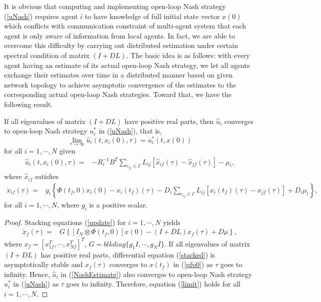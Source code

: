 \documentclass[12pt,draftcls,onecolumn]{IEEEtran}  %
\begin{document}
It is obvious that computing and implementing open-loop Nash strategy (\ref{uNash}) requires agent $i$ to have knowledge of full initial state vector $x(0)$ which conflicts with communication constraint of multi-agent system that each agent is only aware of information from local agents. In fact, we are able to overcome this difficulty by carrying out distributed estimation under certain spectral condition of matrix $(I+DL)$. The basic idea is as follows: with every agent having an estimate of its actual open-loop Nash strategy, we let all agents exchange their estimates over time in a distributed manner based on given network topology to achieve asymptotic convergence of the estimates to the corresponding actual open-loop Nash strategies. Toward that, we have the following result.
\begin{thm}\label{Thm1}
If all eigenvalues of matrix $(I+DL)$ have positive real parts, then $\hat{u}_i$ converges to open-loop Nash strategy $u^*_i$ in (\ref{uNash}), that is,
\begin{equation}
\lim_{\tau\rightarrow\infty}\hat{u}_i(t, x_i(0), \tau) = u^*_i(t,x(0))\label{limit}
\end{equation}
for all $i=1,\cdots,N$ given
\begin{align}
\hat{u}_i(t,x_i(0),\tau) =&-R_i^{-1}B^T\sum_{e_{ij}\in\mathcal{E}}L_{ij}[\hat{x}_{if}(\tau)-\hat{x}_{jf}(\tau)]-\mu_i,\label{NashEstimate}
\end{align}
where $\hat{x}_{if}$ satisfies
\begin{align}
\dot{x}_{if}(\tau)=&g_i\left\{\Phi(t_f,0)x_i(0)-x_i(t_f)(\tau)-D_i\sum_{e_{ij}\in\mathcal{E}}L_{ij}[x_i(t_f)(\tau)-x_{jf}(\tau)]+D_i\mu_i\right\},\label{update}
\end{align}
for all $i=1,\cdots,N$, where $g_i$ is a positive scalar.
\end{thm}
\begin{proof}
Stacking equations (\ref{update}) for $i=1,\cdots,N$ yields
\begin{align}
\dot{x}_{f}(\tau)=&G\left\{[I_N\otimes\Phi(t_f,0)]x(0)-(I+DL)x_f(\tau)+D\mu\right\},\label{stacked}
\end{align}
where $x_f=[x_{1f}^T,\cdots,x_{Nf}^T]^T$, $G=blkdiag\{g_1I,\cdots,g_NI\}$. If all eigenvalues of matrix $(I+DL)$ has positive real parts, differential equation (\ref{stacked}) is asymptotically stable and $x_{f}(\tau)$ converges to $x(t_f)$ in (\ref{pfp0}) as $\tau$ goes to infinity. Hence, $\hat{u}_i$ in (\ref{NashEstimate}) also converges to open-loop Nash strategy $u_i^*$ in (\ref{uNash}) as $\tau$ goes to infinity. Therefore, equation (\ref{limit}) holds for all $i=1,\cdots,N$.
\end{proof}
\end{document}
